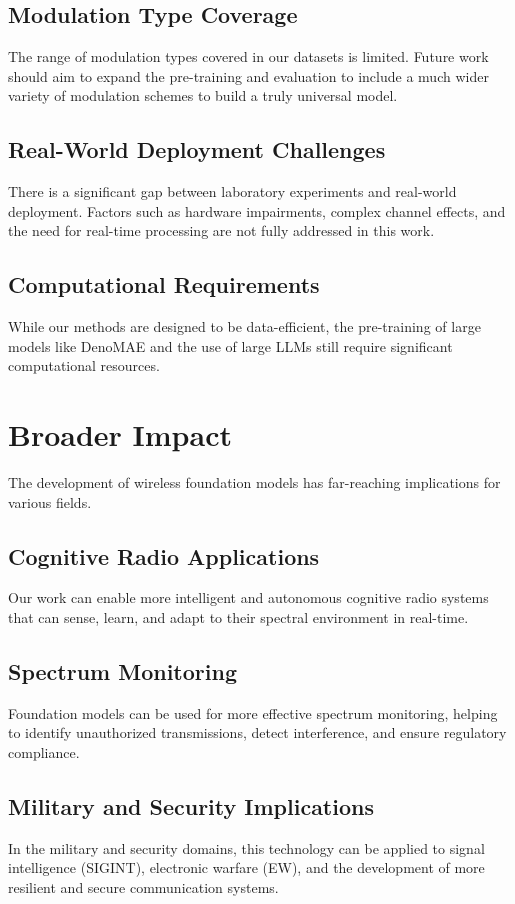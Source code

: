 \subsection{Modulation Type Coverage}
The range of modulation types covered in our datasets is limited. Future work should aim to expand the pre-training and evaluation to include a much wider variety of modulation schemes to build a truly universal model.

\subsection{Real-World Deployment Challenges}
There is a significant gap between laboratory experiments and real-world deployment. Factors such as hardware impairments, complex channel effects, and the need for real-time processing are not fully addressed in this work.

\subsection{Computational Requirements}
While our methods are designed to be data-efficient, the pre-training of large models like DenoMAE and the use of large LLMs still require significant computational resources.

\section{Broader Impact}
The development of wireless foundation models has far-reaching implications for various fields.

\subsection{Cognitive Radio Applications}
Our work can enable more intelligent and autonomous cognitive radio systems that can sense, learn, and adapt to their spectral environment in real-time.

\subsection{Spectrum Monitoring}
Foundation models can be used for more effective spectrum monitoring, helping to identify unauthorized transmissions, detect interference, and ensure regulatory compliance.

\subsection{Military and Security Implications}
In the military and security domains, this technology can be applied to signal intelligence (SIGINT), electronic warfare (EW), and the development of more resilient and secure communication systems.

